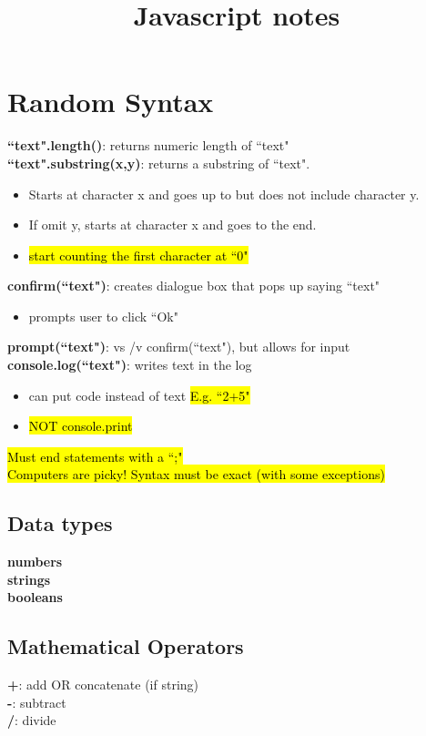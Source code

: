 \documentclass[12pt]{article}
\title{Javascript notes}
\begin{document}
\maketitle
\section{Random Syntax}
\textbf{``text".length()}: returns numeric length of ``text"
\\
\textbf{``text".substring(x,y)}: returns a substring of ``text".  
\\
\begin{itemize}
\item Starts at character x and goes up to but does not include character y.
\item If omit y, starts at character x and goes to the end.
\item \hl{start counting the first character at ``0"}
\end{itemize}
\textbf{confirm(``text")}: creates dialogue box that pops up saying ``text"
\begin{itemize}
\item prompts user to click ``Ok"
\end{itemize}
\textbf{prompt(``text")}: vs /v confirm(``text"), but allows for input
\textbf{console.log(``text")}: writes text in the log
\begin{itemize}
\item can put code instead of text \hl{E.g. ``2+5"}
\item \hl{NOT console.print}
\end{itemize}
\hl{Must end statements with a ``;"}
\\
\hl{Computers are picky! Syntax must be exact (with some exceptions)}
\\
\subsection{Data types}
\textbf{numbers}
\\
\textbf{strings}
\\
\textbf{booleans}
\subsection{Mathematical Operators}
\textbf{+}: add OR concatenate (if string)
\\
\textbf{-}: subtract
\\
\textbf{/}: divide 
\end{document}
